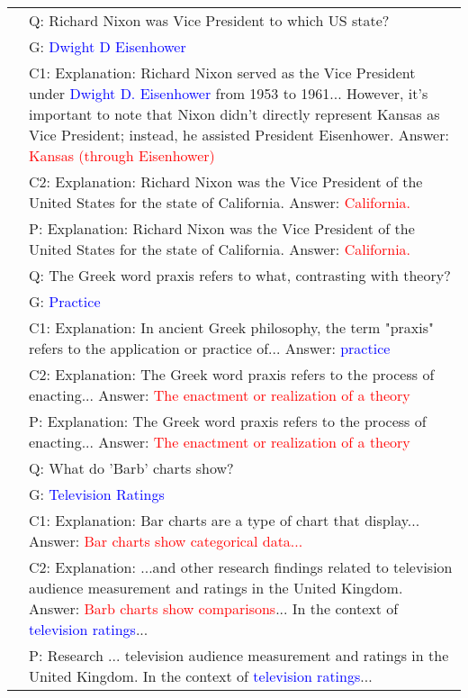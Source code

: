 \begin{table*}[ht]
\begin{tabular}{L{0.1\textwidth}|L{0.85\textwidth}}
& Q: Richard Nixon was Vice President to which US state? \\
& G: \textcolor{blue}{Dwight D Eisenhower} \\
& C1: Explanation: Richard Nixon served as the Vice President under \textcolor{blue}{Dwight D. Eisenhower} from 1953 to 1961... However, it's important to note that Nixon didn't directly represent Kansas as Vice President; instead, he assisted President Eisenhower. Answer: \textcolor{red}{Kansas (through Eisenhower)} \\
& C2: Explanation: Richard Nixon was the Vice President of the United States for the state of California. Answer: \textcolor{red}{California.}\\
& P: Explanation: Richard Nixon was the Vice President of the United States for the state of California. Answer: \textcolor{red}{California.} \\
\midrule

& Q: The Greek word praxis refers to what, contrasting with theory? \\
& G: \textcolor{blue}{Practice} \\
& C1: Explanation: In ancient Greek philosophy, the term "praxis" refers to the application or practice of... Answer: \textcolor{blue}{practice} \\
& C2: Explanation: The Greek word praxis refers to the process of enacting... Answer: \textcolor{red}{The enactment or realization of a theory} \\
& P: Explanation: The Greek word praxis refers to the process of enacting... Answer: \textcolor{red}{The enactment or realization of a theory} \\
\midrule

& Q: What do 'Barb' charts show? \\
& G: \textcolor{blue}{Television Ratings} \\
& C1: Explanation: Bar charts are a type of chart that display... Answer: \textcolor{red}{Bar charts show categorical data...} \\
& C2: Explanation: ...and other research findings related to television audience measurement and ratings in the United Kingdom. Answer: \textcolor{red}{Barb charts show comparisons}... In the context of \textcolor{blue}{television ratings}... \\
& P: Research ... television audience measurement and ratings in the United Kingdom. In the context of \textcolor{blue}{television ratings}... \\
\bottomrule
\end{tabular}
\end{table*}